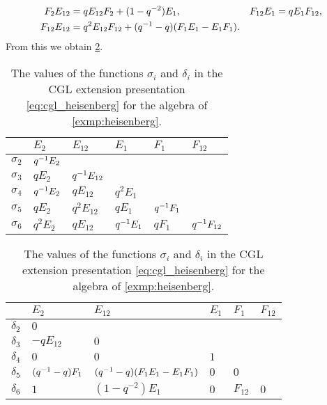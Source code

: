 \begin{example}
\begin{align*}
		F_2 E_{12}   & = q E_{12}F_2 + (1 -q^{-2})E_1,                        &  & F_{12}E_1 = q E_1 F_{12},                   \\
		F_{12}E_{12} & = q^2 E_{12} F_{12} + (q^{-1} - q) (F_1 E_1 - E_1 F_1).
	\end{align*}
	From this we obtain \cref{table:sigma_delta_heisenberg}.
	\begin{table}
		\begin{center}
			\begin{tabular}{c|lllll}
				           & $E_2$       & $E_{12}$       & $E_{1}$     & $F_1$       & $F_{12}$       \\
				\hline
				$\sigma_2$ & $q^{-1} E_2$                                                               \\
				$\sigma_3$ & $q E_2$     & $q^{-1} E_{12}$                                              \\
				$\sigma_4$ & $q^{-1} E_2$ & $q E_{12}$     & $q^2 E_1$                                  \\
				$\sigma_5$ & $q E_2$     & $q^2 E_{12}$   & $q E_1$     & $q^{-1} F_1$                  \\
				$\sigma_6$ & $q^2 E_2$   & $q E_{12}$     & $q^{-1} E_1$ & $q F_1$     & $q^{-1} F_{12}$
			\end{tabular}
			\begin{tabular}{c|lllll}
				           & $E_2$           & $E_{12}$                        & $E_{1}$ & $F_1$    & $F_{12}$ \\
				\hline
				$\delta_2$ & $0$                                                                               \\
				$\delta_3$ & $-q E_{12}$     & $0$                                                             \\
				$\delta_4$ & $0$             & $0$                             & $1$                           \\
				$\delta_5$ & $(q^{-1} -q)F_1$ & $(q^{-1} -q)(F_1 E_1 - E_1 F_1)$ & $0$     & $0$                 \\
				$\delta_6$ & $1$             & $(1- q^{-2})E_1$                & $0$     & $F_{12}$ & $0$
			\end{tabular}
		\end{center}
		\caption{The values of the functions $\sigma_i$ and $\delta_i$ in the CGL extension presentation \cref{eq:cgl_heisenberg} for the algebra of \cref{exmp:heisenberg}. }
		\label{table:sigma_delta_heisenberg}
	\end{table}


\end{example}
